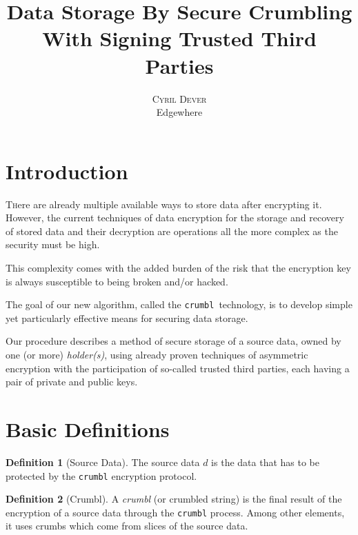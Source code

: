\documentclass[twoside,twocolumn]{article}
\title{Data Storage By Secure Crumbling \\With Signing Trusted Third Parties} %
\author{%
    \textsc{Cyril Dever}\\ %
    \normalsize Edgewhere \\ %
}
\date{\DTMusedate{thedate}}
\renewcommand{\thefootnote}{\arabic{footnote}}
\theoremstyle{definition}
\newtheorem{definition}{Definition}
\theoremstyle{remark}
\begin{document}
\maketitle

{\renewcommand{\thefootnote}{\fnsymbol{footnote}} }


\section{Introduction}

\lettrine[nindent=0em,lines=3]{T}here are already multiple available ways to store data after encrypting it. However, the current techniques of data 
encryption for the storage and recovery of stored data and their decryption are operations all the more complex as the security must be high.

This complexity comes with the added burden of the risk that the encryption key is always susceptible to being broken and/or hacked.

The goal of our new algorithm, called the \texttt{crumbl}\textregistered~technology, is to develop simple yet particularly effective means for securing 
data storage.

Our procedure describes a method of secure storage of a source data, owned by one (or more) \emph{holder(s)}, using already proven techniques of 
asymmetric encryption with the participation of so-called trusted third parties, each having a pair of private and public keys.


\section{Basic Definitions}

\begin{definition}[Source Data]
    \label{sourceData}
    The source data $d$ is the data that has to be protected by the \texttt{crumbl} encryption protocol.
\end{definition}

\begin{definition}[Crumbl]
    \label{crumbl}
    A \emph{crumbl} (or crumbled string) is the final result of the encryption of a source data through the \texttt{crumbl} process.
    Among other elements, it uses crumbs which come from slices of the source data.
\end{definition}
\end{document}
